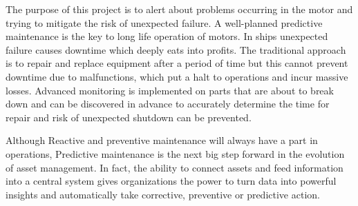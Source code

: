 The purpose of this project is to alert about problems occurring in the motor and trying to mitigate the risk of unexpected failure. A well-planned predictive maintenance is the key to long life operation of motors. In ships unexpected failure causes downtime which deeply eats into profits. The traditional approach is to repair and replace equipment after a period of time but this cannot prevent downtime due to malfunctions, which put a halt to operations and incur massive losses. Advanced monitoring is implemented on parts that are about to break down and can be discovered in advance to accurately determine the time for repair and risk of unexpected shutdown can be prevented. \cite{sampaio_prediction_2019}

Although Reactive and preventive maintenance will always have a part in operations, Predictive maintenance is the next big step forward in the evolution of asset management. In fact, the ability to connect assets and feed information into a central system gives organizations the power to turn data into powerful insights and automatically take corrective, preventive or predictive action.
